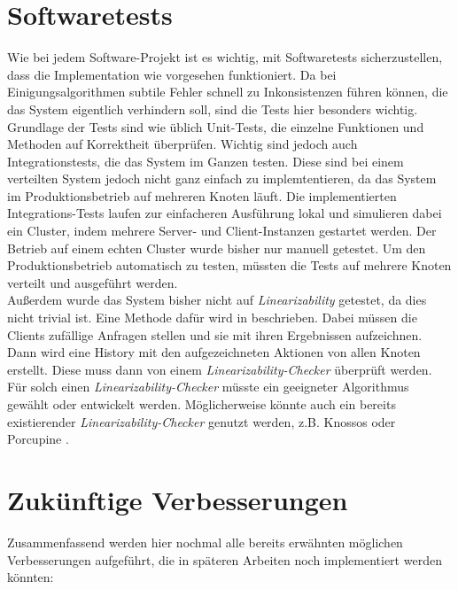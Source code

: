 \section{Softwaretests}

Wie bei jedem Software-Projekt ist es wichtig, mit Softwaretests sicherzustellen, dass die Implementation wie vorgesehen funktioniert. Da bei Einigungsalgorithmen subtile Fehler schnell zu Inkonsistenzen führen können, die das System eigentlich verhindern soll, sind die Tests hier besonders wichtig. Grundlage der Tests sind wie üblich Unit-Tests, die einzelne Funktionen und Methoden auf Korrektheit überprüfen. Wichtig sind jedoch auch Integrationstests, die das System im Ganzen testen. Diese sind bei einem verteilten System jedoch nicht ganz einfach zu implemtentieren, da das System im Produktionsbetrieb auf mehreren Knoten läuft. Die implementierten Integrations-Tests laufen zur einfacheren Ausführung lokal und simulieren dabei ein Cluster, indem mehrere Server- und Client-Instanzen gestartet werden. Der Betrieb auf einem echten Cluster wurde bisher nur manuell getestet. Um den Produktionsbetrieb automatisch zu testen, müssten die Tests auf mehrere Knoten verteilt und ausgeführt werden. \\
Außerdem wurde das System bisher nicht auf \textit{Linearizability} getestet, da dies nicht trivial ist. Eine Methode dafür wird in \cite{testing} beschrieben. Dabei müssen die Clients zufällige Anfragen stellen und sie mit ihren Ergebnissen aufzeichnen. Dann wird eine History mit den aufgezeichneten Aktionen von allen Knoten erstellt. Diese muss dann von einem \textit{Linearizability-Checker} überprüft werden. Für solch einen \textit{Linearizability-Checker} müsste ein geeigneter Algorithmus gewählt oder entwickelt werden. Möglicherweise könnte auch ein bereits existierender \textit{Linearizability-Checker} genutzt werden, z.B. Knossos \cite{knossos} oder Porcupine \cite{porcupine}.\\


\section{Zukünftige Verbesserungen}

Zusammenfassend werden hier nochmal alle bereits erwähnten möglichen Verbesserungen aufgeführt, die in späteren Arbeiten noch implementiert werden könnten:

